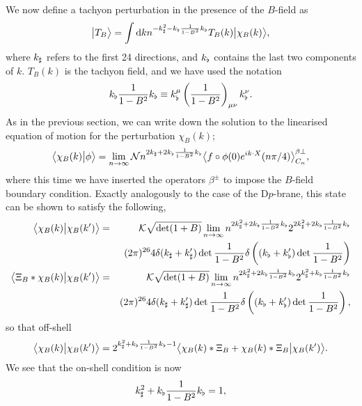 \documentclass[letterpaper,12pt]{article}
\def\Pcm#1{{\mathcal{#1}}}
\def\nn{\nonumber}
\newcommand{\td}{\textup{d}}
\begin{document}
We now define a tachyon perturbation in the presence of the $B$-field as
\begin{equation}
\label{Tb}
 \big|T_B\big\rangle = \int \td k n^{-\kn^2-\kb\frac1{1-B^2}\kb } T_B(k) \big|\chi_B(k)\big\rangle 
,\end{equation}
where $k_\sharp$ refers to the first 24 directions, and $k_\flat$ contains the last two components of $k$.
$T_B(k)$ is the tachyon field, and we have used the notation 
\begin{equation}
k_\flat\frac1{1-B^2}k_\flat \equiv k_\flat^\mu\left(\frac1{1-B^2}\right)_{\mu\nu}k_\flat^\nu
.\end{equation}
As in the previous section, we can write down the solution to the linearised
equation of motion for the perturbation $\chi_B(k)$;
\begin{equation}
\label{chiB}
\big\langle \chi_B(k) \big| \phi \big\rangle = \lim_{n \rightarrow \infty} 
                       \Pcm{N} n^{2\kn+2\kb\frac1{1-B^2}\kb}\big\langle f \circ \phi(0) 
                       e^{ik\cdot X}(n\pi/4)\big\rangle^{\beta \perp}_{C_n}
,\end{equation}
where this time we have inserted the operators $\beta^\pm$ to impose the $B$-field boundary condition.
Exactly analogously to the case of the D$p$-brane, this state can be shown to satisfy the 
following,
\begin{eqnarray}
\label{OSBseom}
   \big\langle\chi_B(k)\big|\chi_B(k')\big\rangle &=& 
     \Pcm{K}\sqrt{\det(1+B)}
    \lim_{n\rightarrow\infty} n^{2\kn^2+2\kb\frac1{1-B^2}\kb}
    2^{2\kn^2+2\kb\frac1{1-B^2}\kb} \nn\\&&   
    (2\pi)^{26}4\delta(\kn+\kn')
     \det \frac1{1-B^2} \delta\left((\kb+\kb') \det \frac1{1-B^2}  \right) 
\label{OSBseomm} \\
   \big\langle \Xi_B * \chi_B(k) \big| \chi_B(k') \big\rangle &=&
    \Pcm{K}\sqrt{\det(1+B)}
    \lim_{n\rightarrow\infty} n^{2\kn^2+2\kb\frac1{1-B^2}\kb}
    2^{\kn^2+\kb\frac1{1-B^2}\kb}  \nn\\&&
    (2\pi)^{26}4\delta(\kn+\kn')
     \det \frac1{1-B^2} \delta\left((\kb+\kb') \det \frac1{1-B^2}  \right) 
,\end{eqnarray}
so that off-shell
\begin{equation}
\label{OSBseommm}
  \big\langle\chi_B(k)\big|\chi_B(k')\big\rangle =  2^{k_\sharp^2+k_\flat\frac1{1-B^2}k_\flat-1}
     \big\langle \chi_B(k) * \Xi_B + \chi_B(k) * \Xi_B \big| \chi_B(k') \big\rangle 
.\end{equation}
We see that the on-shell condition is now
\begin{equation}
\label{onshBc}
 k_\sharp^2+k_\flat\frac1{1-B^2}k_\flat=1 
,\end{equation}
\end{document}
